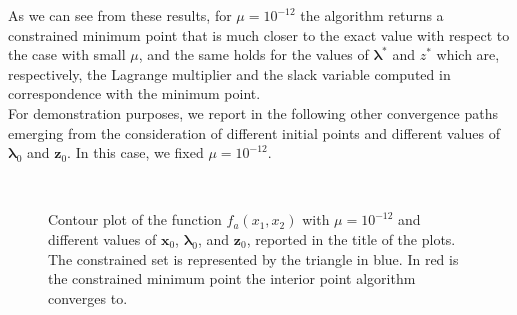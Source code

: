 \documentclass[a4paper,11pt]{article}
\begin{document}
\noindent As we can see from these results, for $\mu=10^{-12}$ the algorithm returns a constrained minimum point that is much closer to the exact value with respect to the case with small $\mu$, and the same holds for the values of $\boldsymbol{\lambda}^*$ and $z^*$ which are, respectively, the Lagrange multiplier and the slack variable computed in correspondence with the minimum point.\\

\noindent For demonstration purposes, we report in the following other convergence paths emerging from the consideration of different initial points and different values of $\boldsymbol{\lambda}_{0}$ and $\textbf{z}_{0}$. In this case, we fixed $\mu=10^{-12}$.
\begin{figure}[H]
	\centering
	 \
	\caption{Contour plot of the function $f_{a}(x_{1},x_{2})$ with $\mu=10^{-12}$ and different values of $\textbf{x}_{0}$, $\boldsymbol{\lambda}_{0}$, and $\textbf{z}_{0}$, reported in the title of the plots. The constrained set is represented by the triangle in blue. In red is the constrained minimum point the interior point algorithm converges to.}
	\label{Fig:func_a_diff_x0}
\end{figure}
\end{document}
